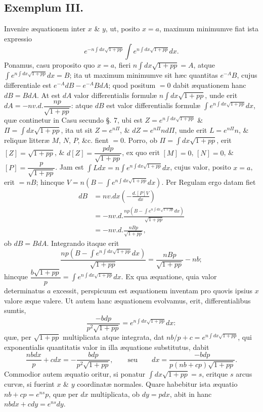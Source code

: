 \subsection*{Exemplum III.}
Invenire æquationem inter $x$ \& $y$, ut, posito $x=a$, maximum minimumve fiat ista expressio
\[e^{-n\int dx\sqrt{1+pp}}\int e^{n\int dx\sqrt{1+pp}}dx.\]
Ponamus, casu proposito quo $x=a$, fieri $n\int dx\sqrt{1+pp}=A$, atque $\int e^{n\int dx\sqrt{1+pp}}dx=B$; ita ut maximum minimumve sit hæc quantitas $e^{-A}B$, cujus differentiale est $e^{-A}dB-e^{-A}BdA$; quod positum $=0$ dabit æquationem hanc $dB=BdA$. At est $dA$ valor differentialis formulæ $n\int dx\sqrt{1+pp}$, unde erit $dA=-nv.d.\dfrac{np}{\sqrt{1+pp}}$: atque $dB$ est valor differentialis formulæ $\int e^{n\int dx\sqrt{1+pp}}dx$, quæ continetur in Casu secundo §. 7, ubi est $Z=e^{n\int dx\sqrt{1+pp}}$ \& $\Pi=\int dx\sqrt{1+pp}$, ita ut sit $Z=e^{n\Pi}$, \& $dZ=e^{n\Pi}nd\Pi$, unde erit $L=e^{n\Pi}n$, \& reliquæ litteræ $M$, $N$, $P$, \&c. fient $=0$. Porro, ob $\Pi=\int dx\sqrt{1+pp}$, erit $[Z]=\sqrt{1+pp}$, \& $d[Z]=\dfrac{pdp}{\sqrt{1+pp}}$, ex quo erit $[M]=0$, $[N]=0$, \& $[P]=\dfrac{p}{\sqrt{1+pp}}$. Jam est $\int Ldx=n\int e^{n\int dx\sqrt{1+pp}}dx$, cujus valor, posito $x=a$, erit $=nB$; hincque $V=n\left(B-\int e^{n\int dx\sqrt{1+pp}}dx\right)$. Per Regulam ergo datam fiet
\[\begin{aligned}dB&=nv.dx\left(-\frac{d.[P]V}{dx}\right)\\&=-nv.d.\frac{np(B-\int e^{n\int dx\sqrt{1+pp}}dx)}{\sqrt{1+pp}}\\&=-nv.d.\frac{nBp}{\sqrt{1+pp}},\end{aligned}\]
ob $dB=BdA$. Integrando itaque erit
\[\frac{np(B-\int e^{n\int dx\sqrt{1+pp}}dx)}{\sqrt{1+pp}}=\frac{nBp}{\sqrt{1+pp}}-nb;\]
hincque $\dfrac{b\sqrt{1+pp}}{p}=\int e^{n\int dx\sqrt{1+pp}}dx$. Ex qua æquatione, quia valor determinatus $a$ excessit, perspicuum est æquationem inventam pro quovis ipsius $x$ valore æque valere. Ut autem hanc æquationem evolvamus, erit, differentialibus sumtis,
\[\frac{-bdp}{p^2\sqrt{1+pp}}=e^{n\int dx\sqrt{1+pp}}dx:\]
quæ, per $\sqrt{1+pp}$ multiplicata atque integrata, dat $nb/p+c=e^{n\int dx\sqrt{1+pp}}$, qui exponentialis quantitatis valor in illa æquatione substitutus, dabit
\[\frac{nbdx}{p}+cdx=-\frac{bdp}{p^2\sqrt{1+pp}},\qquad\text{seu}\qquad dx=\frac{-bdp}{p(nb+cp)\sqrt{1+pp}}.\]
Commodior autem æquatio oritur, si ponatur $\int dx\sqrt{1+pp}=s$, eritque $s$ arcus curvæ, si fuerint $x$ \& $y$ coordinatæ normales. Quare habebitur ista æquatio $nb+cp=e^{ns}p$, quæ per $dx$ multiplicata, ob $dy=pdx$, abit in hanc $nbdx+cdy=e^{ns}dy$.


